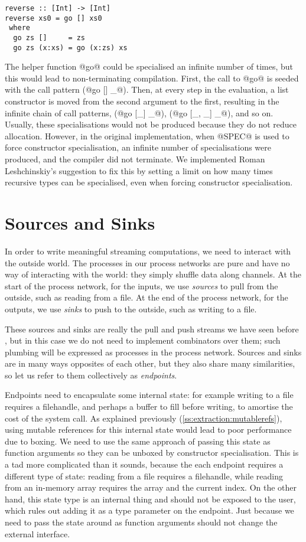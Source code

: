 \begin{lstlisting}
reverse :: [Int] -> [Int]
reverse xs0 = go [] xs0
 where
  go zs []     = zs
  go zs (x:xs) = go (x:zs) xs
\end{lstlisting}

The helper function @go@ could be specialised an infinite number of times, but this would lead to non-terminating compilation.
First, the call to @go@ is seeded with the call pattern (@go [] _@).
Then, at every step in the evaluation, a list constructor is moved from the second argument to the first, resulting in the infinite chain of call patterns, (@go [_] _@), (@go [_, _] _@), and so on.
Usually, these specialisations would not be produced because they do not reduce allocation.
However, in the original implementation, when @SPEC@ is used to force constructor specialisation, an infinite number of specialisations were produced, and the compiler did not terminate.
We implemented Roman Leshchinskiy's suggestion to fix this by setting a limit on how many times recursive types can be specialised, even when forcing constructor specialisation.

\section{Sources and Sinks}
In order to write meaningful streaming computations, we need to interact with the outside world.
The processes in our process networks are pure and have no way of interacting with the world: they simply shuffle data along channels.
At the start of the process network, for the inputs, we use \emph{sources} to pull from the outside, such as reading from a file.
At the end of the process network, for the outputs, we use \emph{sinks} to push to the outside, such as writing to a file.

These sources and sinks are really the pull and push streams we have seen before , but in this case we do not need to implement combinators over them; such plumbing will be expressed as processes in the process network.
Sources and sinks are in many ways opposites of each other, but they also share many similarities, so let us refer to them collectively as \emph{endpoints}.

Endpoints need to encapsulate some internal state: for example writing to a file requires a filehandle, and perhaps a buffer to fill before writing, to amortise the cost of the system call.
As explained previously (\autoref{ss:extraction:mutablerefs}), using mutable references for this internal state would lead to poor performance due to boxing.
We need to use the same approach of passing this state as function arguments so they can be unboxed by constructor specialisation.
This is a tad more complicated than it sounds, because the each endpoint requires a different type of state: reading from a file requires a filehandle, while reading from an in-memory array requires the array and the current index.
On the other hand, this state type is an internal thing and should not be exposed to the user, which rules out adding it as a type parameter on the endpoint.
Just because we need to pass the state around as function arguments should not change the external interface.

